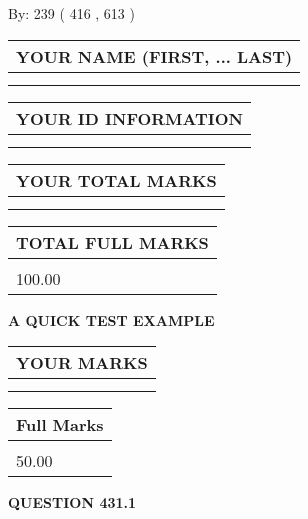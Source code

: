 \documentclass[12pt]{article}
\begin{document}
   
\hspace{1.0in} By: 
 239 ( 416 ,  613 )
   
   
   
   
\newpage 
\setcounter{page}{ 
   431001 } 
   
   
   
   
\noindent\begin{tabular}{|l|}
\hline
YOUR NAME (FIRST, ... LAST)  \\
\hline
 \\ 
 \\ 
\hline
\end{tabular}
\hspace{0.05in} \begin{tabular}{|l|}
\hline
 YOUR   ID   INFORMATION  \\
\hline
 \\ 
 \\ 
\hline
\end{tabular}
   
   
\vspace{0.2in}\noindent\begin{tabular}{|l|}
\hline
YOUR TOTAL MARKS  \\
\hline
 \\ 
 \\ 
\hline
\end{tabular}
\hspace{0.05in} \begin{tabular}{|l|}
\hline
TOTAL FULL MARKS  \\
\hline
 \\ 
100.00 \\
\hline
\end{tabular}
   
   
 \vspace{0.2in}
{\LARGE {\textbf{ A QUICK TEST EXAMPLE}}}
   
   
  
\vspace{0.2in}
  
\noindent\begin{tabular}{|l|}
\hline
 YOUR MARKS  \\
\hline
 \\ 
 \\ 
\hline
\end{tabular}
\hspace{0.05in} \begin{tabular}{|l|}
\hline
 Full Marks  \\
\hline
 \\ 
50.00 \\
\hline
\end{tabular}
{\textbf{\Large{QUESTION
431.1 
}}}
  
\end{document}
